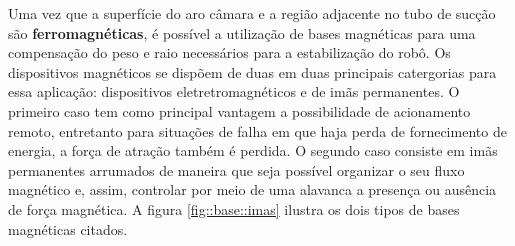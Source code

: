 
Uma vez que a superfície do aro câmara e a região adjacente no tubo de sucção
são \textbf{ferromagnéticas}, é possível a utilização de bases magnéticas para
uma compensação do peso e raio necessários para a estabilização do robô. Os
dispositivos magnéticos se dispõem de duas em duas principais catergorias para
essa aplicação:
dispositivos eletretromagnéticos e de imãs permanentes. O primeiro caso tem como
principal vantagem a possibilidade de acionamento remoto, entretanto para situações de
falha em que haja perda de fornecimento de energia, a força de atração também é
perdida. O segundo caso consiste em imãs permanentes arrumados de maneira que
seja possível organizar o seu fluxo magnético e, assim, controlar por meio de
uma alavanca a presença ou ausência de força magnética. A figura
\ref{fig::base::imas} ilustra os dois tipos de bases magnéticas citados.

